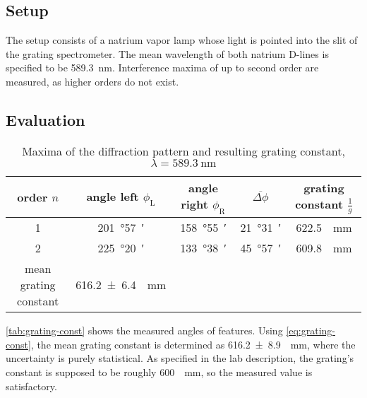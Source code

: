 \subsection{Setup}
The setup consists of a natrium vapor lamp whose light is pointed into the slit of the grating spectrometer.
The mean wavelength of both natrium D-lines is specified to be \SI{589.3}{\nm}.
Interference maxima of up to second order are measured, as higher orders do not exist.

\subsection{Evaluation}
\begin{table}[b!]
	\centering
	\caption[Maxima of the diffraction pattern and resulting grating constant]{Maxima of the diffraction pattern and resulting grating constant, $\lambda=\SI{589.3}{\nm}$}
	\label{tab:grating-const}
	\begin{tabular}{S|SSS|S}
		\toprule
		{order $n$}	&	{angle left $\phi_\text{L}$}	&	{angle right $\phi_\text{R}$}	&	{$\overline{\Delta\phi}$}	&	{grating constant $\frac{1}{g}$}\\
			&	\SI{201}{\degree}\SI{57}{\arcminute}	&	\SI{158}{\degree}\SI{55}{\arcminute}	&	\SI{21}{\degree}\SI{31}{\arcminute}	&	\SI{622.5}{\per\mm}	\\
			2	&	\SI{225}{\degree}\SI{20}{\arcminute}	&	\SI{133}{\degree}\SI{38}{\arcminute}	&	\SI{45}{\degree}\SI{57}{\arcminute}	&	\SI{609.8}{\per\mm}	\\
		\midrule
		{mean grating constant}	&	\SI{616.2(64)}{\per\mm}\\
		\bottomrule
	\end{tabular}
\end{table}

\autoref{tab:grating-const} shows the measured angles of features.
Using \autoref{eq:grating-const}, the mean grating constant is determined as \SI{616.2(89)}{\per\mm}, where the uncertainty is purely statistical.
As specified in the lab description, the grating's constant is supposed to be roughly \SI{600}{\per\mm}, so the measured value is satisfactory.

